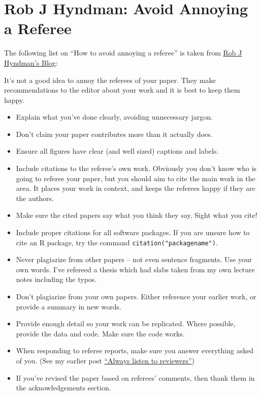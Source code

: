 \documentclass[
]{book}
\providecommand{\tightlist}{%
  \setlength{\itemsep}{0pt}\setlength{\parskip}{0pt}}
\begin{document}
\hypertarget{rob-j-hyndman-avoid-annoying-a-referee}{%
\section{Rob J Hyndman: Avoid Annoying a Referee}\label{rob-j-hyndman-avoid-annoying-a-referee}}

The following list on ``How to avoid annoying a referee'' is taken from \href{https://robjhyndman.com/hyndsight/how-to-avoid-annoying-a-referee/}{Rob J Hyndman's Blog}:

It's not a good idea to annoy the referees of your paper. They make recommendations to the editor about your work and it is best to keep them happy.

\begin{itemize}
\tightlist
\item
  Explain what you've done clearly, avoiding unnecessary jargon.
\item
  Don't claim your paper contributes more than it actually does.
\item
  Ensure all figures have clear (and well sized) captions and labels.
\item
  Include citations to the referee's own work. Obviously you don't know who is going to referee your paper, but you should aim to cite the main work in the area. It places your work in context, and keeps the referees happy if they are the authors.
\item
  Make sure the cited papers say what you think they say. Sight what you cite!
\item
  Include proper citations for all software packages. If you are unsure how to cite an R package, try the command \texttt{citation("packagename")}.
\item
  Never plagiarize from other papers -- not even sentence fragments. Use your own words. I've refereed a thesis which had slabs taken from my own lecture notes including the typos.
\item
  Don't plagiarize from your own papers. Either reference your earlier work, or provide a summary in new words.
\item
  Provide enough detail so your work can be replicated. Where possible, provide the data and code. Make sure the code works.
\item
  When responding to referee reports, make sure you answer everything asked of you. (See my earlier post \href{https://robjhyndman.com/hyndsight/always-listen-to-reviewers/}{``Always listen to reviewers''})
\item
  If you've revised the paper based on referees' comments, then thank them in the acknowledgements section.
\end{itemize}
\end{document}
